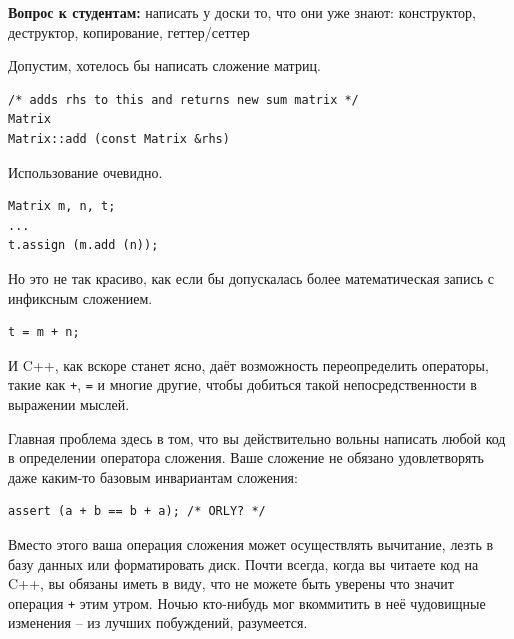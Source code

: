 \documentclass[a4paper,12pt,oneside]{article}
\newif\ifanswers
\begin{document}
\textbf{Вопрос к студентам:} написать у доски то, что они уже знают: конструктор, деструктор, копирование, геттер/сеттер

\ifanswers
Возможный ответ:

\begin{lstlisting}
class Matrix
{
public:
  Matrix (int n, int m) : m_n (n), m_m (m), m_buf (new int[n*m]()) {}
  ~Matrix () { delete [] m_buf; }

  Matrix (const Matrix &rhs) : m_n (rhs.m_n), m_m (rhs.m_m), m_buf (new int[m_n * m_m])
    {
      std::memcpy (m_buf, rhs.m_buf, rhs.m_n * rhs.m_m * sizeof (int));
    }

  void set (int x, int y, int val) { m_buf[x*m_m + y] = val; }
  int get (int x, int y) { return m_buf[x*m_m + y]; }

private:
  int m_n, m_m;
  int *m_buf;
};
\end{lstlisting}
\fi

Допустим, хотелось бы написать сложение матриц.

\begin{lstlisting}
/* adds rhs to this and returns new sum matrix */
Matrix
Matrix::add (const Matrix &rhs)
\end{lstlisting}

Использование очевидно.

\begin{lstlisting}
Matrix m, n, t;
...
t.assign (m.add (n));
\end{lstlisting}

Но это не так красиво, как если бы допускалась более математическая запись с инфиксным сложением.

\begin{lstlisting}
t = m + n;
\end{lstlisting}

И C++, как вскоре станет ясно, даёт возможность переопределить операторы, такие как \lstinline!+!, \lstinline!=! и многие другие, чтобы добиться такой непосредственности в выражении мыслей.

Главная проблема здесь в том, что вы действительно вольны написать любой код в определении оператора сложения. Ваше сложение не обязано удовлетворять даже каким-то базовым инвариантам сложения:

\begin{lstlisting}
assert (a + b == b + a); /* ORLY? */
\end{lstlisting}

Вместо этого ваша операция сложения может осуществлять вычитание, лезть в базу данных или форматировать диск. Почти всегда, когда вы читаете код на C++, вы обязаны иметь в виду, что не можете быть уверены что значит операция \lstinline!+! этим утром. Ночью кто-нибудь мог вкоммитить в неё чудовищные изменения – из лучших побуждений, разумеется.
\end{document}
